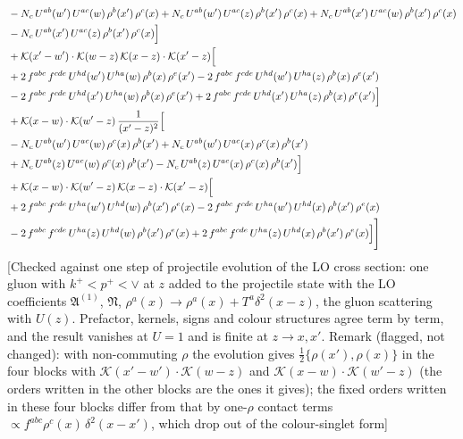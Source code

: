 \documentclass[9pt]{article}
\numberwithin{equation}{section}
\begin{document}
\begin{align}
& -N_{c}\,U^{ab}(w')\,U^{ac}(w)\,\rho^{b}(x')\,\rho^{c}(x) +N_{c}\,U^{ab}(w')\,U^{ac}(z)\,\rho^{b}(x')\,\rho^{c}(x) +N_{c}\,U^{ab}(x')\,U^{ac}(w)\,\rho^{b}(x')\,\rho^{c}(x)\notag\\
& -N_{c}\,U^{ab}(x')\,U^{ac}(z)\,\rho^{b}(x')\,\rho^{c}(x)\Big]\notag\\
& +\mathcal{K}(x'-w')\cdot\mathcal{K}(w-z)\,\mathcal{K}(x-z)\cdot\mathcal{K}(x'-z)\Big[\notag\\
& +2\,f^{abc}\,f^{cde}\,U^{hd}(w')\,U^{ha}(w)\,\rho^{b}(x)\,\rho^{e}(x') -2\,f^{abc}\,f^{cde}\,U^{hd}(w')\,U^{ha}(z)\,\rho^{b}(x)\,\rho^{e}(x')\notag\\
& -2\,f^{abc}\,f^{cde}\,U^{hd}(x')\,U^{ha}(w)\,\rho^{b}(x)\,\rho^{e}(x') +2\,f^{abc}\,f^{cde}\,U^{hd}(x')\,U^{ha}(z)\,\rho^{b}(x)\,\rho^{e}(x')\Big]\notag\\
& +\mathcal{K}(x-w)\cdot\mathcal{K}(w'-z)\,\frac{1}{(x'-z)^{2}}\Big[\notag\\
& -N_{c}\,U^{ab}(w')\,U^{ac}(w)\,\rho^{c}(x)\,\rho^{b}(x') +N_{c}\,U^{ab}(w')\,U^{ac}(x)\,\rho^{c}(x)\,\rho^{b}(x')\notag\\
& +N_{c}\,U^{ab}(z)\,U^{ac}(w)\,\rho^{c}(x)\,\rho^{b}(x') -N_{c}\,U^{ab}(z)\,U^{ac}(x)\,\rho^{c}(x)\,\rho^{b}(x')\Big]\notag\\
& +\mathcal{K}(x-w)\cdot\mathcal{K}(w'-z)\,\mathcal{K}(x-z)\cdot\mathcal{K}(x'-z)\Big[\notag\\
& +2\,f^{abc}\,f^{cde}\,U^{ha}(w')\,U^{hd}(w)\,\rho^{b}(x')\,\rho^{e}(x) -2\,f^{abc}\,f^{cde}\,U^{ha}(w')\,U^{hd}(x)\,\rho^{b}(x')\,\rho^{e}(x)\notag\\
& -2\,f^{abc}\,f^{cde}\,U^{ha}(z)\,U^{hd}(w)\,\rho^{b}(x')\,\rho^{e}(x) +2\,f^{abc}\,f^{cde}\,U^{ha}(z)\,U^{hd}(x)\,\rho^{b}(x')\,\rho^{e}(x)\Big]\Bigg]
\end{align} {\color{red}[Checked against one step of projectile evolution of the LO cross section: one gluon with $k^{+}<p^{+}<\vee$ at $z$ added to the projectile state with the LO coefficients $\mathfrak{A}^{(1)}$, $\mathfrak{N}$, $\rho^{a}(x)\to\rho^{a}(x)+T^{a}\delta^{2}(x-z)$, the gluon scattering with $U(z)$. Prefactor, kernels, signs and colour structures agree term by term, and the result vanishes at $U=1$ and is finite at $z\to x,x'$. Remark (flagged, not changed): with non-commuting $\rho$ the evolution gives $\tfrac12\{\rho(x'),\rho(x)\}$ in the four blocks with $\mathcal{K}(x'-w')\cdot\mathcal{K}(w-z)$ and $\mathcal{K}(x-w)\cdot\mathcal{K}(w'-z)$ (the orders written in the other blocks are the ones it gives); the fixed orders written in these four blocks differ from that by one-$\rho$ contact terms $\propto f^{abc}\rho^{c}(x)\,\delta^{2}(x-x')$, which drop out of the colour-singlet form]}\par\noindent 
\end{document}
